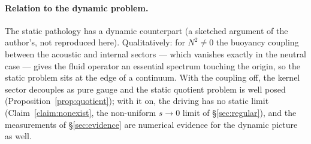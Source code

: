 \documentclass[11pt]{article}
\begin{document}
\paragraph{Relation to the dynamic problem.}
The static pathology has a dynamic counterpart (a sketched argument of
the author's, not reproduced here). Qualitatively: for $N^2 \neq 0$ the
buoyancy coupling between the acoustic and internal sectors --- which
vanishes exactly in the neutral case --- gives the fluid operator an
essential spectrum touching the origin, so the static problem sits at
the edge of a continuum. With the coupling off, the kernel sector
decouples as pure gauge and the static quotient problem is well posed
(Proposition~\ref{prop:quotient}); with it on, the driving has no
static limit (Claim~\ref{claim:nonexist}, the non-uniform $s \to 0$
limit of \S\ref{sec:regular}), and the measurements of
\S\ref{sec:evidence} are numerical evidence for the dynamic picture as
well.
\end{document}
